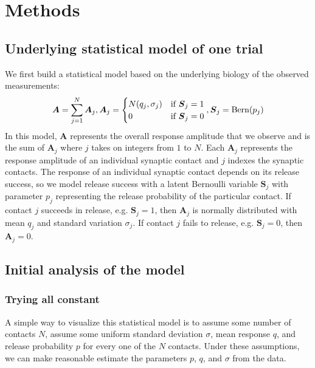 \documentclass{article}
\newcommand{\rv}[1] {
\text{$\bm{#1}$}
}
\DeclareMathOperator{\bern}{Bern}
\begin{document}
\section{Methods}

\subsection{Underlying statistical model of one trial}
We first build a statistical model based on the underlying biology of the observed measurements:
\[
  \rv{A} = \sum_{j=1}^N \rv{A}_j, \rv{A}_j = \begin{cases}
    N(q_j,\sigma_j) & \text{if $\rv{S}_j = 1$} \\
    0 & \text{if $\rv{S}_j = 0$}
  \end{cases}, \rv{S}_j = \bern(p_j)
\]
In this model, $\rv{A}$ represents the overall response amplitude that we observe and is the sum of $\rv{A}_j$ where $j$ takes on integers from $1$ to $N$. Each $\rv{A}_j$ represents the response amplitude of an individual synaptic contact and $j$ indexes the synaptic contacts. The response of an individual synaptic contact depends on its release success, so we model release success with a latent Bernoulli variable $\rv{S}_j$ with parameter $p_j$ representing the release probability of the particular contact. If contact $j$ succeeds in release, e.g. $\rv{S}_j = 1$, then $\rv{A}_j$ is normally distributed with mean $q_j$ and standard variation $\sigma_j$. If contact $j$ fails to release, e.g. $\rv{S}_j = 0$, then $\rv{A}_j = 0$.

\subsection{Initial analysis of the model}

\subsubsection{Trying all constant}
A simple way to visualize this statistical model is to assume some number of contacts $N$, assume some uniform standard deviation $\sigma$, mean response $q$, and release probability $p$ for every one of the $N$ contacts. Under these assumptions, we can make reasonable estimate the parameters $p$, $q$, and $\sigma$ from the data.
\end{document}
